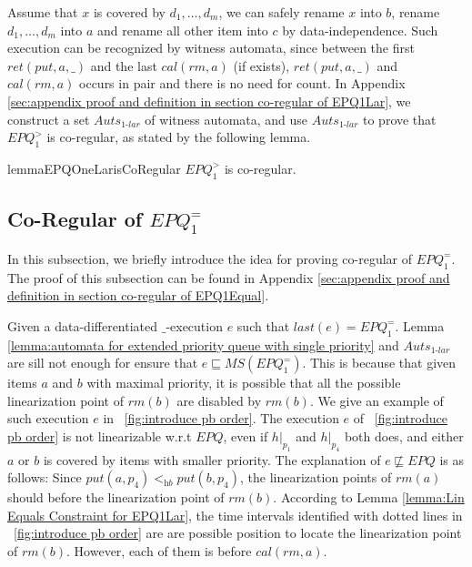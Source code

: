 Assume that $x$ is covered by $d_1,\ldots,d_m$, we can safely rename $x$ into $b$, rename $d_1,\ldots,d_m$ into $a$ and rename all other item into $c$ by data-independence. Such execution can be recognized by witness automata, since between the first $\textit{ret}(\textit{put},a,\_)$ and the last $\textit{cal}(\textit{rm},a)$ (if exists), $\textit{ret}(\textit{put},a,\_)$ and $\textit{cal}(\textit{rm},a)$ occurs in pair and there is no need for count. In Appendix \ref{sec:appendix proof and definition in section co-regular of EPQ1Lar}, we construct a set $\textit{Auts}_{\textit{1-lar}}$ of witness automata, and use $\textit{Auts}_{\textit{1-lar}}$ to prove that $\textit{EPQ}_1^{>}$ is co-regular, as stated by the following lemma.

\begin{restatable}{lemma}{EPQOneLarisCoRegular}
\label{lemma:EPQ1Lar is co-regular}
$\textit{EPQ}_1^{>}$ is co-regular.
\end{restatable}




\subsection{Co-Regular of $\textit{EPQ}_1^{=}$}
\label{subsec:co-regular of EPQ1Equal}

In this subsection, we briefly introduce the idea for proving co-regular of $\textit{EPQ}_1^{=}$. The proof of this subsection can be found in Appendix \ref{sec:appendix proof and definition in section co-regular of EPQ1Equal}.

Given a data-differentiated $\_$-execution $e$ such that $\textit{last}(e) = \textit{EPQ}_1^{=}$. Lemma \ref{lemma:automata for extended priority queue with single priority} and $\textit{Auts}_{\textit{1-lar}}$ are sill not enough for ensure that $e \sqsubseteq \textit{MS}(\textit{EPQ}_1^{=})$. This is because that given items $a$ and $b$ with maximal priority, it is possible that all the possible linearization point of $\textit{rm}(b)$ are disabled by $\textit{rm}(b)$. We give an example of such execution $e$ in \figurename~\ref{fig:introduce pb order}. The execution $e$ of \figurename~\ref{fig:introduce pb order} is not linearizable w.r.t $\textit{EPQ}$, even if $h \vert_{p_1}$ and $h \vert_{p_4}$ both does, and either $a$ or $b$ is covered by items with smaller priority. The explanation of $e \not\sqsubseteq \textit{EPQ}$ is as follows: Since $\textit{put}(a,p_4) <_{\textit{hb}} \textit{put}(b,p_4)$, the linearization points of $\textit{rm}(a)$ should before the linearization point of $\textit{rm}(b)$. According to Lemma \ref{lemma:Lin Equals Constraint for EPQ1Lar}, the time intervals identified with dotted lines in \figurename~\ref{fig:introduce pb order} are are possible position to locate the linearization point of $\textit{rm}(b)$. However, each of them is before $\textit{cal}(\textit{rm},a)$.

